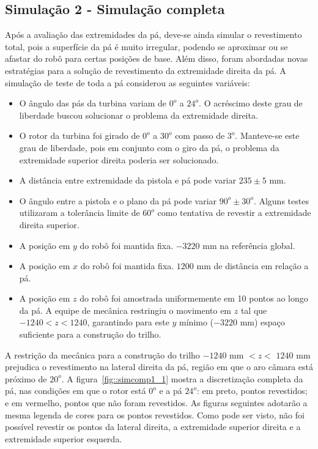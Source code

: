 \subsection{Simulação 2 - Simulação completa}

Após a avaliação das extremidades da pá, deve-se ainda simular o revestimento
total, pois a superfície da pá é muito irregular, podendo se aproximar ou se
afastar do robô para certas posições de base. Além disso, foram abordadas novas
estratégias para a solução de revestimento da extremidade direita da pá. A
simulação de teste de toda a pá considerou as seguintes variáveis:

\begin{itemize}
  \item O ângulo das pás da turbina variam de $0^o$ a $24^o$. O acréscimo deste
  grau de liberdade buscou solucionar o problema da extremidade direita.
  \item O rotor da turbina foi girado de $0^o$ a $30^o$ com passo de $3^o$.
  Manteve-se este grau de liberdade, pois em conjunto com o giro da pá, o
  problema da extremidade superior direita poderia ser solucionado.
  \item A distância entre extremidade da pistola e pá pode variar $235
  \pm 5$ mm.
  \item O ângulo entre a pistola e o plano da pá pode variar $90^o \pm
  30^o$. Alguns testes utilizaram a tolerância limite de $60^o$ como tentativa
  de revestir a extremidade direita superior.
  \item A posição em $y$ do robô foi mantida fixa. $-3220$ mm na referência
  global.
  \item A posição em $x$ do robô foi mantida fixa. $1200$ mm de
  distância em relação a pá.
  \item A posição em $z$ do robô foi amostrada uniformemente em 10 pontos ao
  longo da pá. A equipe de mecânica restringiu o movimento em $z$ tal que
  $-1240 < z < 1240$, garantindo para este $y$ mínimo ($-3220$ mm) espaço
  suficiente para a construção do trilho.
\end{itemize}

A restrição da mecânica para a construção do trilho $-1240$ mm $< z <$ $1240$ mm
prejudica o revestimento na lateral direita da pá, região em que o aro câmara
está próximo de $20^o$. A figura~\ref{fig::simcomp1_1} mostra a
discretização completa da pá, nas condições em que o rotor está $0^o$ e a pá
$24^o$:
em preto, pontos revestidos; e em vermelho, pontos que não foram revestidos. As
figuras seguintes adotarão a mesma legenda de cores para os pontos revestidos.
Como pode ser visto, não foi possível revestir os pontos da lateral direita, a extremidade superior direita e a extremidade superior esquerda.

